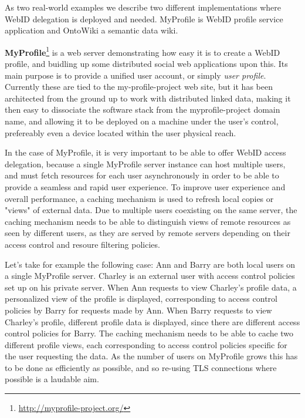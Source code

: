\documentclass[a4paper]{llncs}
\begin{document}
As two real-world examples we describe two different implementations where WebID delegation is deployed and needed.
MyProfile is WebID profile service application and OntoWiki a semantic data wiki.

\textbf{MyProfile}\footnote{\url{http://myprofile-project.org/}}
is a web server demonstrating how easy it is to create a WebID profile, and buidling up some distributed social web applications upon this.
Its main purpose is to provide a unified user account, or simply \textit{user profile}. Currently these are tied to the my-profile-project web site, but it has been architected from the ground up to  work with distributed linked data, making it then easy to dissociate the software stack from the myprofile-project domain name,  and allowing it to be deployed on a machine under the user's control, prefereably even a device located within the user physical reach.



In the case of MyProfile, it is very important to be able to offer WebID access delegation, because a single MyProfile server instance can host multiple users, and must fetch resources for each user asynchronously in order to be able to provide a seamless and rapid user experience.
To improve user experience and overall performance, a caching mechanism is used to refresh local copies or "views" of external data.
Due to multiple users coexisting on the same server, the caching mechanism needs to be able to distinguish views of remote resources as seen by different users, as they are served by remote servers depending on their access control and resoure filtering policies.

Let's take for example the following case:
Ann and Barry are both local users on a single MyProfile server.
Charley is an external user with access control policies set up on his private server.
When Ann requests to view Charley's profile data, a personalized view of the profile is displayed, corresponding to access control policies by Barry for requests made by Ann.
When Barry requests to view Charley's profile, different profile data is displayed, since there are different access control policies for Barry.
The caching mechanism needs to be able to cache two different profile views, each corresponding to access control policies specific for the user requesting the data.
As the number of users on MyProfile grows this has to be done as efficiently as possible, and so re-using TLS connections where possible is a laudable aim.
\end{document}
